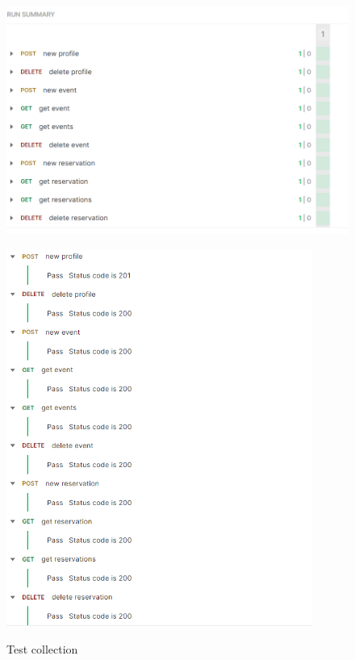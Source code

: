 \begin{figure}[h!]
\begin{center}
  \includegraphics[width=14cm]{Iterazione 2/test/postman/collections.PNG}\\
  \caption{Test collection}
  \includegraphics[width=10cm]{Iterazione 2/test/postman/collections sng.PNG}\\
\end{center}
\end{figure}